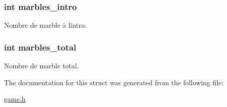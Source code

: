 \subsubsection[{\texorpdfstring{marbles\+\_\+intro}{marbles_intro}}]{\setlength{\rightskip}{0pt plus 5cm}int marbles\+\_\+intro}\hypertarget{struct_level_a49a2ee16a8bedba06cdd451170c2e5ad}{}\label{struct_level_a49a2ee16a8bedba06cdd451170c2e5ad}
Nombre de marble à l\textquotesingle{}intro. 
\subsubsection[{\texorpdfstring{marbles\+\_\+total}{marbles_total}}]{\setlength{\rightskip}{0pt plus 5cm}int marbles\+\_\+total}\hypertarget{struct_level_a96e2ff7aa7e440993d021792df0fcfd3}{}\label{struct_level_a96e2ff7aa7e440993d021792df0fcfd3}
Nombre de marble total. 

The documentation for this struct was generated from the following file\+:\begin{DoxyCompactItemize}
\item 
\hyperlink{game_8h}{game.\+h}\end{DoxyCompactItemize}

